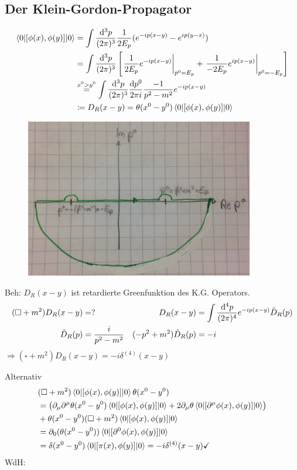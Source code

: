 \subsection{Der Klein-Gordon-Propagator}
	\begin{align*}
		\braket{0 | [\phi(x), \phi(y)] | 0} &= 
		\int \frac{\mathrm{d}^3 p}{(2 \pi)^3} \frac{1}{2 E_p} (e^{-i p(x- y)} - e^{ip (y-x)}) \\
		&= \int \frac{\mathrm{d}^3 p}{(2 \pi)^3}  
		\left[
			 \left. \frac{1}{2 E_p} e^{-ip(x-y)} \right|_{p^0 = E_p}
			 + \left.  \frac{1}{- 2 E_p} e^{ip(x-y)} \right|_{p^0 = -E_p}
		\right] \\
		&\overset{x^0 > y^0}{=}
		\int \frac{\mathrm{d}^3 p}{(2 \pi)^3} \frac{\mathrm{d} p^0}{2 \pi i}
		\frac{-1}{p^2 -m^2} e^{-ip(x-y)} \\
		&\coloneqq D_R (x-y) = \theta(x^0 -y^0) 
		\braket{0 | [\phi(x), \phi(y)] | 0}
	\end{align*}

	\begin{figure} [h]
		\begin{center}
			\includegraphics[width = 10cm]{Klein-Gordon-Propagator}
		\end{center}	
	\end{figure}
\FloatBarrier
Beh: $D_R(x-y)$ ist retardierte Greenfunktion des K.G. Operators.
	\begin{align*}
		(\square + m^2) D_R(x-y) &= ? &
		D_R(x-y) &= \int \frac{\mathrm{d}^4 p}{(2 \pi)^4} e^{-ip(x-y)} \tilde{D}_R (p) \\
		\tilde{D}_R(p) &= \frac{i}{p^2 - m^2} & 
		(-p^2 + m^2) \tilde{D}_R(p) &= -i
	\end{align*}
$\Rightarrow (\square + m^2) D_R(x-y) = -i \delta^{(4)} (x-y)$

Alternativ
	\begin{align*}
		& (\square + m^2)\braket{0 | [\phi(x), \phi(y)] | 0} \theta(x^0 - y^0) \\
		&=
		\left(
			\partial_\mu \partial^\mu \theta(x^0 - y^0) \braket{0 | [\phi(x), \phi(y)] | 0} + 2 \partial_\mu \theta \braket{0 | [\partial^\mu \phi(x), \phi(y)] | 0}
		\right) \\
		&+ \theta(x^0 - y^0) (\square + m^2) \braket{0 | [\phi(x), \phi(y)] | 0} \\
		&= \partial_0 (\theta(x^0 -y^0)) \braket{0 | [\partial^0 \phi(x), \phi(y)] | 0} \\
		&= \delta(x^0 -y^0) \braket{0 | [\pi(x), \phi(y)] | 0} = -i \delta^{(4)}(x-y) \checkmark
	\end{align*} 
WdH: 


